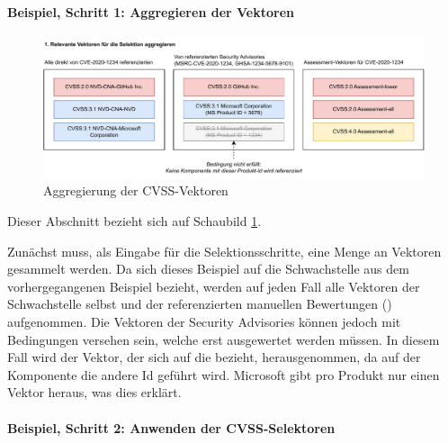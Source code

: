 \paragraph{Beispiel, Schritt 1: Aggregieren der Vektoren} \label{par:projektbericht-loesungsweg-cvss-selection-example-step-1}

\begin{figure}[htbp] %
    \centering
    \includegraphics[width=1\textwidth, keepaspectratio]{res/grafiken/cvss-selection-process-selection-1}
    \caption{Aggregierung der CVSS-Vektoren}
    \label{fig:cvss-selection-process-selection-1}
\end{figure}

Dieser Abschnitt bezieht sich auf Schaubild \ref{fig:cvss-selection-process-selection-1}.

Zunächst muss, als Eingabe für die Selektionsschritte, eine Menge an Vektoren gesammelt werden.
Da sich dieses Beispiel auf die Schwachstelle  aus dem vorhergegangenen Beispiel bezieht, werden auf jeden Fall alle Vektoren der Schwachstelle selbst und der referenzierten manuellen Bewertungen () aufgenommen.
Die Vektoren der Security Advisories können jedoch mit Bedingungen versehen sein, welche erst ausgewertet werden müssen.
In diesem Fall wird der Vektor, der sich auf die  bezieht, herausgenommen, da auf der Komponente die andere Id  geführt wird.
Microsoft gibt pro Produkt nur einen Vektor heraus, was dies erklärt.

\paragraph{Beispiel, Schritt 2: Anwenden der CVSS-Selektoren} \label{par:projektbericht-loesungsweg-cvss-selection-example-step-2}

